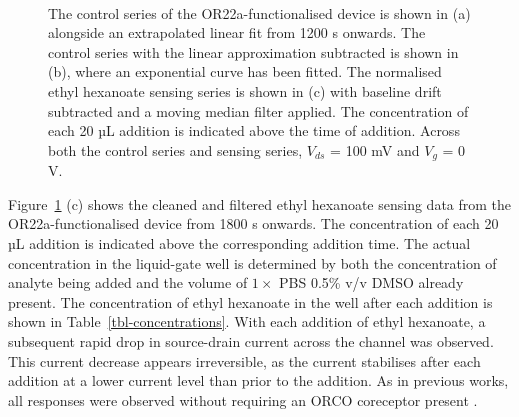 \documentclass[
  a4paper,
]{scrbook}
\begin{document}
\begin{figure}
\begin{minipage}[t]{0.70\linewidth}
{{}

}

\end{minipage}%
%
\begin{minipage}[t]{0.15\linewidth}

{\centering 

~

}

\end{minipage}%

\caption[The control series of the successfully OR22a-functionalised
device alongside a linear fitted curve, as well as the control series
with the linear approximation subtracted with an exponential fitted
curve, and the filtered sensing series with baseline drift
subtracted.]{\label{fig-OR22a-series}The control series of the
OR22a-functionalised device is shown in (a) alongside an extrapolated
linear fit from 1200 s onwards. The control series with the linear
approximation subtracted is shown in (b), where an exponential curve has
been fitted. The normalised ethyl hexanoate sensing series is shown in
(c) with baseline drift subtracted and a moving median filter applied.
The concentration of each 20 µL addition is indicated above the time of
addition. Across both the control series and sensing series, \(V_{ds}\)
= 100 mV and \(V_g\) = 0 V.}

\end{figure}

Figure~\ref{fig-OR22a-series} (c) shows the cleaned and filtered ethyl
hexanoate sensing data from the OR22a-functionalised device from 1800 s
onwards. The concentration of each 20 µL addition is indicated above the
corresponding addition time. The actual concentration in the liquid-gate
well is determined by both the concentration of analyte being added and
the volume of \(1 \times\) PBS 0.5\% v/v DMSO already present. The
concentration of ethyl hexanoate in the well after each addition is
shown in Table~\ref{tbl-concentrations}. With each addition of ethyl
hexanoate, a subsequent rapid drop in source-drain current across the
channel was observed. This current decrease appears irreversible, as the
current stabilises after each addition at a lower current level than
prior to the addition. As in previous works, all responses were observed
without requiring an ORCO coreceptor present
\autocite{Murugathas2019a,Murugathas2020,Khadka2019,Cheema2021}.
\end{document}
